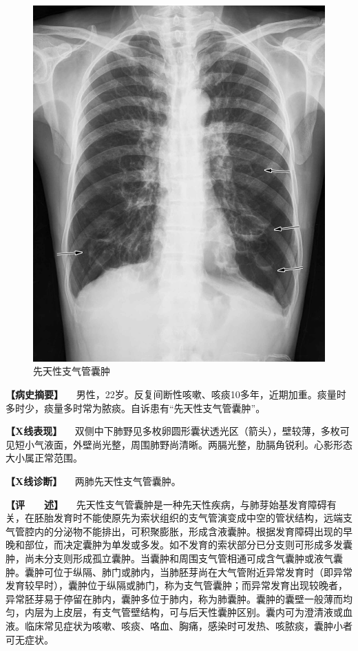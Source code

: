 \begin{figure}[!htbp]
 \centering
 \includegraphics{./images/Image00138.jpg}
 \captionsetup{justification=centering}
 \caption{先天性支气管囊肿}
 \label{fig3-2-2}
  \end{figure} 

\textbf{【病史摘要】}
　男性，22岁。反复间断性咳嗽、咳痰10多年，近期加重。痰量时多时少，痰量多时常为脓痰。自诉患有“先天性支气管囊肿”。

\textbf{【X线表现】}
　双侧中下肺野见多枚卵圆形囊状透光区（箭头），壁较薄，多枚可见短小气液面，外壁尚光整，周围肺野尚清晰。两膈光整，肋膈角锐利。心影形态大小属正常范围。

\textbf{【X线诊断】} 　两肺先天性支气管囊肿。

\textbf{【评　　述】}
　先天性支气管囊肿是一种先天性疾病，与肺芽始基发育障碍有关，在胚胎发育时不能使原先为索状组织的支气管演变成中空的管状结构，远端支气管腔内的分泌物不能排出，可积聚膨胀，形成含液囊肿。根据发育障碍出现的早晚和部位，而决定囊肿为单发或多发。如不发育的索状部分已分支则可形成多发囊肿，尚未分支则形成孤立囊肿。当囊肿和周围支气管相通可成含气囊肿或液气囊肿。囊肿可位于纵隔、肺门或肺内，当肺胚芽尚在大气管附近异常发育时（即异常发育较早时），囊肿位于纵隔或肺门，称为支气管囊肿；而异常发育出现较晚者，异常胚芽易于停留在肺内，囊肿多位于肺内，称为肺囊肿。囊肿的囊壁一般薄而均匀，内层为上皮层，有支气管壁结构，可与后天性囊肿区别。囊内可为澄清液或血液。临床常见症状为咳嗽、咳痰、咯血、胸痛，感染时可发热、咳脓痰，囊肿小者可无症状。

